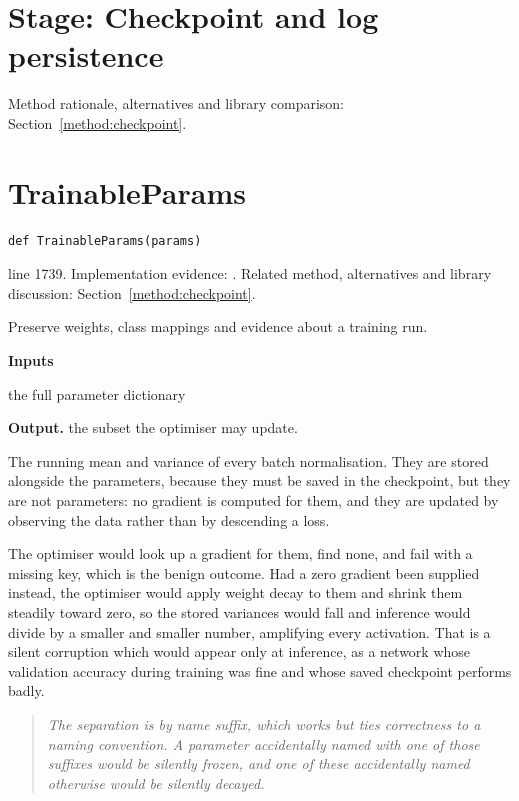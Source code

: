 \section*{Stage: Checkpoint and log persistence}
Method rationale, alternatives and library comparison: Section~\ref{method:checkpoint}.
\section{TrainableParams}\label{fn:train:TrainableParams}
\begin{lstlisting}[style=sig]
def TrainableParams(params)
\end{lstlisting}
 line 1739. Implementation evidence: \cite{code2026}. Related method, alternatives and library discussion: Section~\ref{method:checkpoint}.


Preserve weights, class mappings and evidence about a training run.




\noindent\textbf{Inputs}
\begin{description}[leftmargin=2.2em,style=nextline,font=\normalfont\ttfamily]\setlength\itemsep{1pt}
  \item[{params}] \normalfont the full parameter dictionary
\end{description}

\noindent\textbf{Output.} the subset the optimiser may update.


The running mean and variance of every batch normalisation. They are stored alongside the parameters, because they must be saved in the checkpoint, but they are not parameters: no gradient is computed for them, and they are updated by observing the data rather than by descending a loss.


The optimiser would look up a gradient for them, find none, and fail with a missing key, which is the benign outcome. Had a zero gradient been supplied instead, the optimiser would apply weight decay to them and shrink them steadily toward zero, so the stored variances would fall and inference would divide by a smaller and smaller number, amplifying every activation. That is a silent corruption which would appear only at inference, as a network whose validation accuracy during training was fine and whose saved checkpoint performs badly.


\begin{quote}\small\itshape The separation is by name suffix, which works but ties correctness to a naming convention. A parameter accidentally named with one of those suffixes would be silently frozen, and one of these accidentally named otherwise would be silently decayed.\end{quote}


